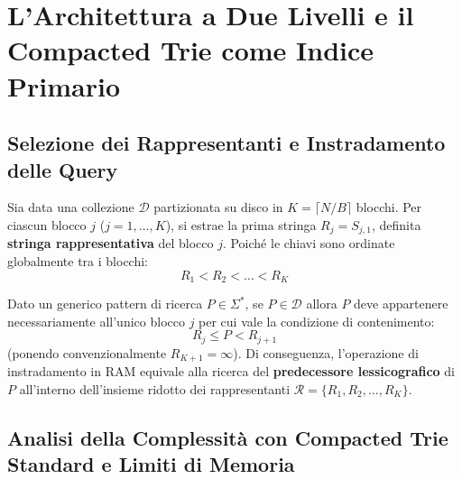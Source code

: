 \FloatBarrier
\section{L'Architettura a Due Livelli e il Compacted Trie come Indice Primario}
\label{sec:architettura-due-livelli-compacted}

\FloatBarrier
\subsection{Selezione dei Rappresentanti e Instradamento delle Query}
\label{subsec:selezione-rappresentanti}

Sia data una collezione $\mathcal{D}$ partizionata su disco in $K = \lceil N/B \rceil$ blocchi. Per ciascun blocco $j$ ($j = 1, \dots, K$), si estrae la prima stringa $R_j = S_{j, 1}$, definita \textbf{stringa rappresentativa} del blocco $j$. Poich\'e le chiavi sono ordinate globalmente tra i blocchi:
\begin{equation}
  R_1 < R_2 < \dots < R_K
\end{equation}

\begin{proposition}
Dato un generico pattern di ricerca $P \in \Sigma^*$, se $P \in \mathcal{D}$ allora $P$ deve appartenere necessariamente all'unico blocco $j$ per cui vale la condizione di contenimento:
\begin{equation}
  R_j \le P < R_{j+1}
\end{equation}
(ponendo convenzionalmente $R_{K+1} = \infty$). Di conseguenza, l'operazione di instradamento in RAM equivale alla ricerca del \textbf{predecessore lessicografico} di $P$ all'interno dell'insieme ridotto dei rappresentanti $\mathcal{R} = \{R_1, R_2, \dots, R_K\}$.
\end{proposition}

\FloatBarrier
\subsection{Analisi della Complessit\`a con Compacted Trie Standard e Limiti di Memoria}
\label{subsec:limiti-compacted-trie-standard}

